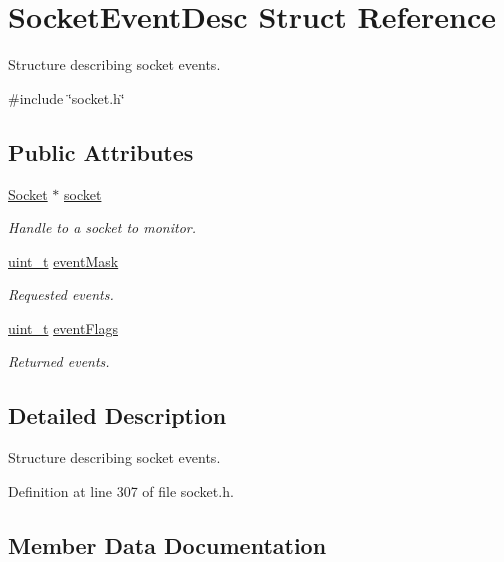 \hypertarget{structSocketEventDesc}{}\section{Socket\+Event\+Desc Struct Reference}
\label{structSocketEventDesc}


Structure describing socket events.  




{\ttfamily \#include \char`\"{}socket.\+h\char`\"{}}

\subsection*{Public Attributes}
\begin{DoxyCompactItemize}
\item 
\hyperlink{socket_8h_aa85acfb0fa336ef495e6ba87fb88fc48}{Socket} $\ast$ \hyperlink{structSocketEventDesc_a31fbff5c4d515c81ff43934e8aeba08c}{socket}
\begin{DoxyCompactList}\small\item\em Handle to a socket to monitor. \end{DoxyCompactList}\item 
\hyperlink{compiler__port_8h_a12a1e9b3ce141648783a82445d02b58d}{uint\+\_\+t} \hyperlink{structSocketEventDesc_ac979f02c9bb6b9517ed9c2d1b17e6201}{event\+Mask}
\begin{DoxyCompactList}\small\item\em Requested events. \end{DoxyCompactList}\item 
\hyperlink{compiler__port_8h_a12a1e9b3ce141648783a82445d02b58d}{uint\+\_\+t} \hyperlink{structSocketEventDesc_aca8e460cfc75c58870239584437a3c1d}{event\+Flags}
\begin{DoxyCompactList}\small\item\em Returned events. \end{DoxyCompactList}\end{DoxyCompactItemize}


\subsection{Detailed Description}
Structure describing socket events. 

Definition at line 307 of file socket.\+h.



\subsection{Member Data Documentation}
\mbox{\label{structSocketEventDesc_aca8e460cfc75c58870239584437a3c1d}} 
